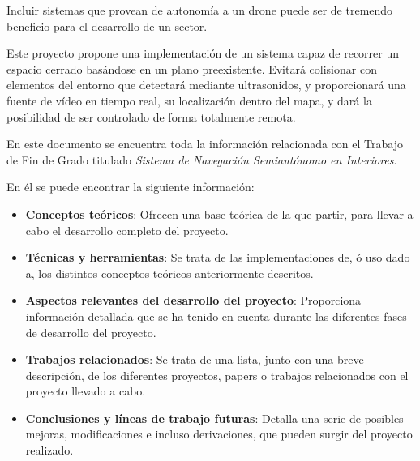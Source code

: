 \noindent Incluir sistemas que provean de autonomía a un drone puede ser de tremendo beneficio para el desarrollo de un sector. 

Este proyecto propone una implementación de un sistema capaz de recorrer un espacio cerrado basándose en un plano preexistente. Evitará colisionar con elementos del entorno que detectará mediante ultrasonidos, y proporcionará una fuente de vídeo en tiempo real, su localización dentro del mapa, y dará la posibilidad de ser controlado de forma totalmente remota.

\noindent En este documento se encuentra toda la información relacionada con el Trabajo de Fin de Grado titulado \textit{Sistema de Navegación Semiautónomo en Interiores}.

\noindent En él se puede encontrar la siguiente información:
\begin{itemize}
\item \textbf{Conceptos teóricos}: Ofrecen una base teórica de la que partir, para llevar a cabo el desarrollo completo del proyecto.
\item \textbf{Técnicas y herramientas}: Se trata de las implementaciones de, ó uso dado a, los distintos conceptos teóricos anteriormente descritos.
\item \textbf{Aspectos relevantes del desarrollo del proyecto}: Proporciona información detallada que se ha tenido en cuenta durante las diferentes fases de desarrollo del proyecto.
\item \textbf{Trabajos relacionados}: Se trata de una lista, junto con una breve descripción, de los diferentes proyectos, papers o trabajos relacionados con el proyecto llevado a cabo.
\item \textbf{Conclusiones y líneas de trabajo futuras}: Detalla una serie de posibles mejoras, modificaciones e incluso derivaciones, que pueden surgir del proyecto realizado.
\end{itemize}
